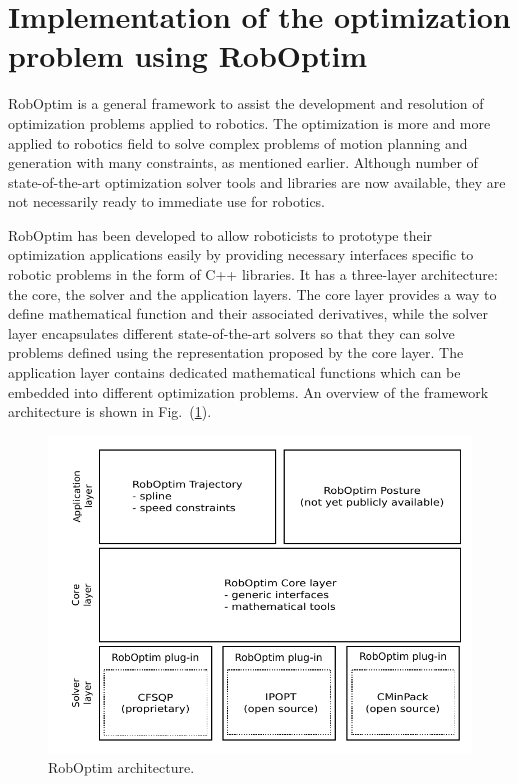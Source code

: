 \documentclass[letterpaper, 10 pt, conference]{ieeeconf}  %
\begin{document}
\section{Implementation of the optimization problem using RobOptim}
\label{sec:implementation}

RobOptim is a general framework to assist the development and resolution of
optimization problems applied to robotics. 
The optimization is more and more applied to robotics field to solve
complex problems of motion planning and generation with many
constraints, as mentioned earlier.
Although number of state-of-the-art optimization solver tools and
libraries are now available, they are not necessarily ready to
immediate use for robotics.

RobOptim has been developed to allow roboticists to prototype their
optimization applications easily by providing necessary interfaces
specific to robotic problems in the form of C++ libraries.
It has a three-layer
architecture: the core, the solver and the application layers.
The core layer provides a way to define mathematical
function and their associated derivatives, while the solver layer encapsulates
different state-of-the-art solvers so that they can solve problems
defined using the representation proposed by the core layer. 
The application layer contains dedicated mathematical functions which
can be embedded into different optimization problems. An overview of
the framework architecture is shown in Fig.~(\ref{fig:roboptim}).

\begin{figure}[b]
  \includegraphics[width=\linewidth]{figure/roboptim-architecture.pdf}
  \caption{RobOptim  architecture.}
  \label{fig:roboptim}
\end{figure}
\end{document}
